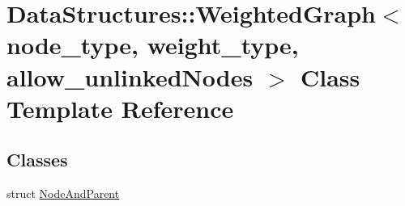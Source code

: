 \hypertarget{class_data_structures_1_1_weighted_graph}{\section{Data\-Structures\-:\-:Weighted\-Graph$<$ node\-\_\-type, weight\-\_\-type, allow\-\_\-unlinked\-Nodes $>$ Class Template Reference}
\label{class_data_structures_1_1_weighted_graph}
}
\subsection*{Classes}
\begin{DoxyCompactItemize}
\item 
struct \hyperlink{struct_data_structures_1_1_weighted_graph_1_1_node_and_parent}{Node\-And\-Parent}
\end{DoxyCompactItemize}
